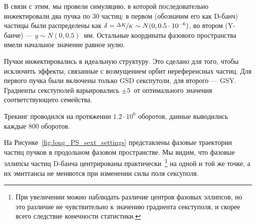 В связи с этим, мы провели симуляцию, в которой последовательно инжектировали два пучка по 30 частиц: 
в первом (обозначим его как D-банч) частицы были распределены как 
${\delta=\sfrac{\Delta K}{K}\sim N(0, 0.5\cdot 10^{-6})}$, во втором (Y-банче) --- ${y\sim N(0, 0.5)}$~мм. 
Остальные координаты фазового пространства имели начальное значение равное нулю. 

Пучки инжектировались в идеальную структуру. Это сделано для того, чтобы исключить эффекты, 
связанные с возмущением орбит нереференсных частиц. Для первого пучка были включены 
только GSD секспутоли, для второго --- GSY. Градиенты секступолей варьировались 
$\pm 5$~\Tlmsq от оптимального значения соответствующего семейства.

Трекинг проводился на протяжении $1.2\cdot 10^6$ оборотов, данные выводились каждые 800 оборотов.

На Рисунке~\ref{fig:long_PS_sext_settings} представлены фазовые траектории частиц пучков 
в продольном фазовом пространстве. Мы видим, что фазовые эллипсы частиц D-банча 
центрированы практически~\footnote{При увеличении можно наблюдать различие центров фазовых эллипсов, 
	но это различие не чувствительно к значению градиента секступоля, 
	и скорее всего следствие конечности статистики.} на одной и той же точке, а их эмиттансы 
не меняются при изменении силы поля сексуполя. 

